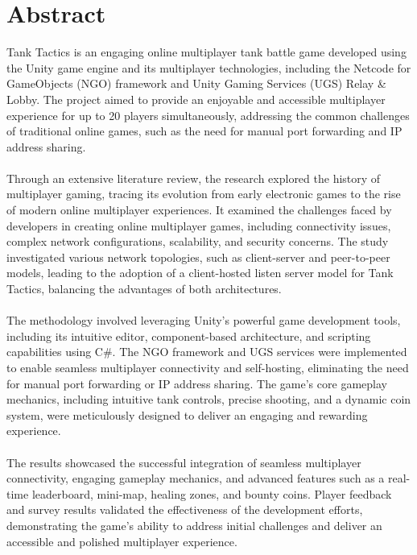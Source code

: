 \chapter*{\center \Large  Abstract}
Tank Tactics is an engaging online multiplayer tank battle game developed using the Unity game engine and its multiplayer technologies, including the Netcode for GameObjects (NGO) framework and Unity Gaming Services (UGS) Relay \& Lobby. The project aimed to provide an enjoyable and accessible multiplayer experience for up to 20 players simultaneously, addressing the common challenges of traditional online games, such as the need for manual port forwarding and IP address sharing.
\\
\noindent
\\
Through an extensive literature review, the research explored the history of multiplayer gaming, tracing its evolution from early electronic games to the rise of modern online multiplayer experiences. It examined the challenges faced by developers in creating online multiplayer games, including connectivity issues, complex network configurations, scalability, and security concerns. The study investigated various network topologies, such as client-server and peer-to-peer models, leading to the adoption of a client-hosted listen server model for Tank Tactics, balancing the advantages of both architectures.
\\
\noindent
\\
The methodology involved leveraging Unity's powerful game development tools, including its intuitive editor, component-based architecture, and scripting capabilities using C\#. The NGO framework and UGS services were implemented to enable seamless multiplayer connectivity and self-hosting, eliminating the need for manual port forwarding or IP address sharing. The game's core gameplay mechanics, including intuitive tank controls, precise shooting, and a dynamic coin system, were meticulously designed to deliver an engaging and rewarding experience.
\\
\noindent
\\
The results showcased the successful integration of seamless multiplayer connectivity, engaging gameplay mechanics, and advanced features such as a real-time leaderboard, mini-map, healing zones, and bounty coins. Player feedback and survey results validated the effectiveness of the development efforts, demonstrating the game's ability to address initial challenges and deliver an accessible and polished multiplayer experience.
